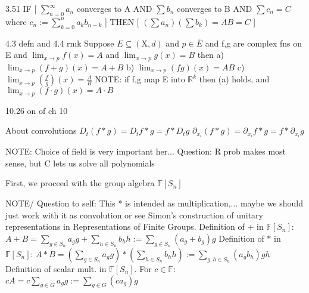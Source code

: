 \documentclass{article}
\theoremstyle{definition}
\begin{document}
3.51
IF [ $\sum_{n=0}^\infty a_n $ converges to A  AND $\sum b_n $ converges to B AND $\sum c_n = C$ where $ c_n :=\sum_{k=0}^n a_k b_{n-k}$ ] THEN [ $(\sum a_n)( \sum b_k) = AB = C$ ]

4.3 defn and 4.4 rmk
Suppose $E \subseteq (\mathrm{X}, d)$ and $p \in \bar{E} $ and f,g are complex fns on E and $\lim_{x\rightarrow p} f(x) = A$ and $\lim_{x\rightarrow p} g(x) = B$
then 
a) $\lim_{x\rightarrow p} (f+g)(x) = A+B$ 
b)  $\lim_{x\rightarrow p} (fg)(x) = AB$
c)  $\lim_{x\rightarrow p} (\frac{f}{g})(x) = \frac{A}{B}$
NOTE: if f,g map E into $\mathbb{R}^k$ then (a) holds, and $\lim_{x\rightarrow p} (f\cdot g)(x) = A \cdot B $

 10.26 on of ch 10


About convolutions
$D_t(f*g) = D_t f * g = f * D_t g $ 
$\partial_{x_i}(f*g) = \partial_{x_i}f * g = f* \partial_{x_i}g $

NOTE: Choice of field is very important her...
Question: R prob makes most sense, but C lets us solve all polynomials

First, we proceed with the group algebra $\mathbb{F}[S_n]$

NOTE/ Question to self: This * is intended as multiplication,... maybe we should just work with it as convolution or see Simon's construction of unitary representations in Representations of Finite Groups.
Definition of + in $\mathbb{F}[S_n]$: $A + B =\sum_{g\in S_n} a_g g + \sum_{h \in S_n} b_h h :=\sum_{g \in S_n} (a_g + b_g) g $
Definition of $*$ in $\mathbb{F}[S_n]$: $A * B = (\sum_{g\in S_n} a_g g) * (\sum_{h \in S_n} b_h h) :=\sum_{g,h \in S_n} (a_g b_h) gh $
Definition of scalar mult. in $\mathbb{F}[S_n]$. For $ c \in \mathbb{F}$: $cA = c\sum_{g\in G} a_g g := \sum_{g\in G} (c a_g) g $  
\end{document}
